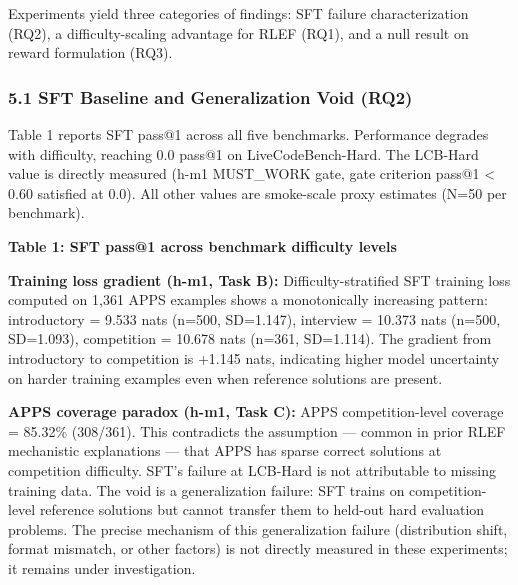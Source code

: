 
Experiments yield three categories of findings: SFT failure characterization (RQ2), a difficulty-scaling advantage for RLEF (RQ1), and a null result on reward formulation (RQ3).

\subsubsection{5.1 SFT Baseline and Generalization Void (RQ2)}

Table 1 reports SFT pass@1 across all five benchmarks. Performance degrades with difficulty, reaching 0.0 pass@1 on LiveCodeBench-Hard. The LCB-Hard value is directly measured (h-m1 MUST\_WORK gate, gate criterion pass@1 < 0.60 satisfied at 0.0). All other values are smoke-scale proxy estimates (N=50 per benchmark).

\textbf{Table 1: SFT pass@1 across benchmark difficulty levels}

\begin{table}[htbp]
\centering
{}
\end{table}

\textbf{Training loss gradient (h-m1, Task B):} Difficulty-stratified SFT training loss computed on 1,361 APPS examples shows a monotonically increasing pattern: introductory = 9.533 nats (n=500, SD=1.147), interview = 10.373 nats (n=500, SD=1.093), competition = 10.678 nats (n=361, SD=1.114). The gradient from introductory to competition is +1.145 nats, indicating higher model uncertainty on harder training examples even when reference solutions are present.

\textbf{APPS coverage paradox (h-m1, Task C):} APPS competition-level coverage = 85.32\% (308/361). This contradicts the assumption --- common in prior RLEF mechanistic explanations --- that APPS has sparse correct solutions at competition difficulty. SFT's failure at LCB-Hard is not attributable to missing training data. The void is a generalization failure: SFT trains on competition-level reference solutions but cannot transfer them to held-out hard evaluation problems. The precise mechanism of this generalization failure (distribution shift, format mismatch, or other factors) is not directly measured in these experiments; it remains under investigation.

